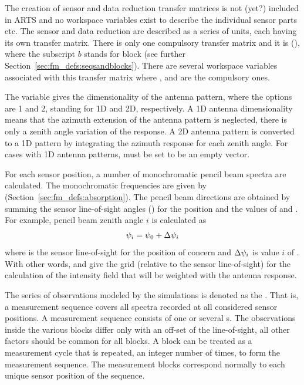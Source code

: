 The creation of sensor and data reduction transfer matrices is not
(yet?) included in ARTS and no workspace variables exist to describe
the individual sensor parts etc. The sensor and data reduction are
described as a series of units, each having its own transfer matrix.
There is only one compulsory transfer matrix and it is 
(), where the subscript $b$ stands for block (see further
Section~\ref{sec:fm_defs:seqsandblocks}). There are several workspace
variables associated with this transfer matrix where
,  and
 are the compulsory ones.

The variable  gives the dimensionality of the
antenna pattern, where the
options are 1 and 2, standing for 1D and 2D, respectively. A 1D
antenna dimensionality means that the azimuth extension of the
antenna pattern is neglected, there is only a zenith angle variation
of the response. A 2D antenna pattern is converted to a 1D pattern by
integrating the azimuth response for each zenith angle. For cases
with 1D antenna patterns,  must be set to
be an empty vector.

For each sensor position, a number of monochromatic pencil beam
spectra are calculated. The monochromatic frequencies are given by
 (Section~\ref{sec:fm_defs:absorption}). The pencil
beam directions are obtained by summing the sensor line-of-sight
angles () for the position and the values of
 and . For
example, pencil beam zenith angle $i$ is calculated as
\begin{equation}
  \psi_{i} = \psi_{0} + \Delta\psi_{i}
  \label{eq:fm_defs:psi_grid}
\end{equation}
where  is the sensor line-of-sight for the position of
concern and $\Delta\psi_{i}$ is value $i$ of
.  With other words,
 and  give
the grid (relative to the sensor line-of-sight) for the calculation of
the intensity field that will be weighted with the antenna response.


\label{sec:fm_defs:seqsandblocks}

The series of observations modeled by the simulations is denoted as
the . That is, a measurement sequence
covers all spectra recorded at all considered sensor positions. A
measurement sequence consists of one or several s. The observations inside the various blocks differ only with
an off-set of the line-of-sight, all other factors should be common
for all blocks. A block can be treated as a measurement cycle that is
repeated, an integer number of times, to form the measurement
sequence.  The measurement blocks correspond normally to each unique
sensor position of the sequence.

